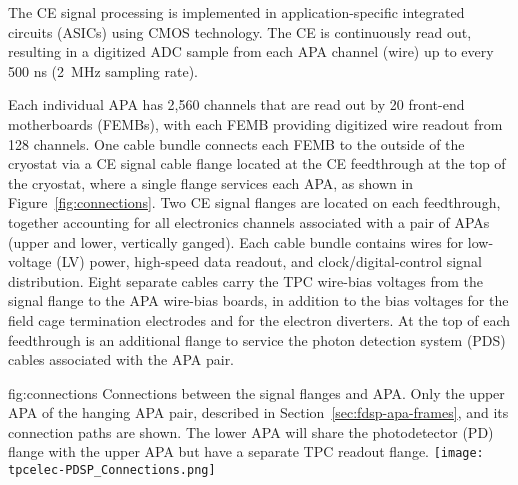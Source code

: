 The CE signal processing is implemented in application-specific integrated circuits (ASICs)
using CMOS technology.  The CE is continuously read out, resulting in a digitized ADC
sample from each APA channel (wire) up to every 500 ns (2~MHz sampling rate).

Each individual APA has 2,560 channels that are read out by 20 front-end motherboards (FEMBs), with
each FEMB providing digitized wire readout from 128 channels.  One cable bundle connects each FEMB to
the outside of the cryostat via a CE signal cable flange located at the CE feedthrough at the
top of the cryostat, where a single flange services each APA, as shown in Figure~\ref{fig:connections}.  Two CE signal flanges are located on each feedthrough, together accounting for all electronics channels associated with a pair of APAs (upper and lower, vertically ganged).
Each cable bundle contains wires for low-voltage (LV) power, high-speed data readout, and
clock/digital-control signal distribution.  Eight separate cables carry the TPC wire-bias voltages
from the signal flange to the APA wire-bias boards, in addition to the bias voltages for the field
cage termination electrodes and for the electron diverters.  At the top of each feedthrough is an additional flange to service the photon detection system (PDS) cables associated with the APA pair.

\begin{dunefigure}
{fig:connections}
{Connections between the signal flanges and APA. Only the upper APA of the hanging APA pair, described in Section~\ref{sec:fdsp-apa-frames}, and its connection paths are shown. The lower APA will share the photodetector (PD) flange with the upper APA but have a separate TPC readout flange.}
\hspace{1cm}
\texttt{[image: tpcelec-PDSP\_Connections.png]}
\end{dunefigure}

